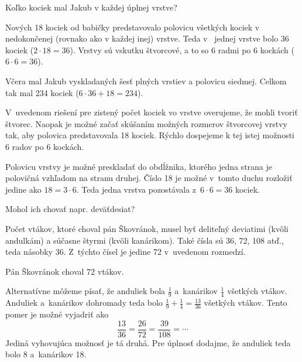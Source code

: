 {%
\napad
Koľko kociek mal Jakub v každej úplnej vrstve?

\riesenie
Nových 18 kociek od babičky predstavovalo polovicu všetkých kociek v nedokončenej (rovnako ako v každej inej) vrstve.
Teda v~ jednej vrstve bolo 36 kociek ($2\cdot18=36$).
Vrstvy sú vskutku štvorcové, a to so 6 radmi po 6 kockách ($6\cdot6=36$).

Včera mal Jakub vyskladaných šesť plných vrstiev a polovicu siedmej.
Celkom tak mal 234 kociek ($6\cdot36+18=234$).

\poznamky
V~uvedenom riešení pre zistený počet kociek vo vrstve overujeme, že mohli tvoriť štvorec.
Naopak je možné začať skúšaním možných rozmerov štvorcovej vrstvy tak, aby polovica predstavovala 18 kociek.
Rýchlo dospejeme k tej istej možnosti 6 radov po 6 kockách.

Polovicu vrstvy je možné preskladať do obdĺžnika, ktorého jedna strana je polovičná vzhľadom na stranu druhej.
Číslo 18 je možné v~tomto duchu rozložiť jedine ako $18=3\cdot6$.
Teda jedna vrstva pozostávala z~$6\cdot6=36$ kociek.}

{%
\napad
Mohol ich chovať napr. deväťdesiat?

\riesenie
Počet vtákov, ktoré choval pán Škovránok, musel byť deliteľný deviatimi (kvôli andulkám) a súčasne štyrmi (kvôli kanárikom).
Také čísla sú 36, 72, 108 atď., teda násobky 36.
Z~týchto čísel je jedine 72 v~uvedenom rozmedzí.

Pán Škovránok choval 72 vtákov.

\poznamka
Alternatívne môžeme písať, že anduliek bola $\frac19$ a~kanárikov $\frac14$ všetkých vtákov.
Anduliek a~kanárikov dohromady teda bolo $\frac19+\frac14=\frac{13}{36}$ všetkých vtákov.
Tento pomer je možné vyjadriť ako
$$
\frac{13}{36}=\frac{26}{72}=\frac{39}{108}=\cdots
$$
Jediná vyhovujúca možnosť je tá druhá.
Pre úplnosť dodajme, že anduliek teda bolo 8 a~kanárikov 18.}

